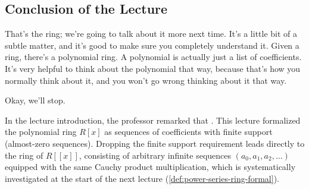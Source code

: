 \subsection{Conclusion of the Lecture}

\begin{speech}[01:29:40 - 01:30:00]
That's the ring; we're going to talk about it more next time. It's a little bit of a subtle matter, and it's good to make sure you completely understand it. Given a ring, there's a polynomial ring. A polynomial is actually just a list of coefficients. It's very helpful to think about the polynomial that way, because that's how you normally think about it, and you won't go wrong thinking about it that way.

Okay, we'll stop. 
\end{speech}

\begin{aiNote}
In the lecture introduction, the professor remarked that . This lecture formalized the polynomial ring $R[x]$ as sequences of coefficients with finite support (almost-zero sequences). Dropping the finite support requirement leads directly to the ring of  $R[[x]]$, consisting of arbitrary infinite sequences $(a_0, a_1, a_2, \dots)$ equipped with the same Cauchy product multiplication, which is systematically investigated at the start of the next lecture (\cref{def:power-series-ring-formal}).
\end{aiNote}


